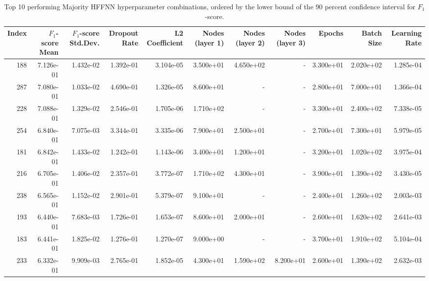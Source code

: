 \begin{table}
\caption{Top 10 performing Majority HFFNN hyperparameter combinations, ordered by the lower bound of the 90 percent confidence interval for $F_1$-score.}
\label{tab:05_best_majority_hffnn_hpars}
\begin{tabular}{rrrrrrrrrrr}
\toprule
Index & $F_1$-score Mean & $F_1$-score Std.Dev. & Dropout Rate & L2 Coefficient & Nodes (layer 1) & Nodes (layer 2) & Nodes (layer 3) & Epochs & Batch Size & Learning Rate \\
\midrule
188 & 7.126e-01 & 1.432e-02 & 1.392e-01 & 3.104e-05 & 3.500e+01 & 4.650e+02 & - & 3.300e+01 & 2.020e+02 & 1.285e-04 \\
287 & 7.080e-01 & 1.033e-02 & 4.690e-01 & 1.326e-05 & 8.600e+01 & - & - & 2.800e+01 & 7.000e+01 & 1.366e-04 \\
228 & 7.088e-01 & 1.329e-02 & 2.546e-01 & 1.705e-06 & 1.710e+02 & - & - & 3.300e+01 & 2.400e+02 & 7.338e-05 \\
254 & 6.840e-01 & 7.075e-03 & 3.344e-01 & 3.335e-06 & 7.900e+01 & 2.500e+01 & - & 2.700e+01 & 7.300e+01 & 5.979e-05 \\
181 & 6.842e-01 & 1.433e-02 & 1.242e-01 & 1.143e-06 & 3.400e+01 & 1.200e+01 & - & 3.200e+01 & 1.020e+02 & 3.975e-04 \\
216 & 6.705e-01 & 1.406e-02 & 2.357e-01 & 3.772e-07 & 1.710e+02 & 4.300e+01 & - & 3.900e+01 & 1.390e+02 & 3.430e-05 \\
238 & 6.565e-01 & 1.152e-02 & 2.901e-01 & 5.379e-07 & 9.100e+01 & - & - & 2.400e+01 & 1.260e+02 & 2.003e-03 \\
193 & 6.440e-01 & 7.683e-03 & 1.726e-01 & 1.653e-07 & 8.600e+01 & 2.000e+01 & - & 2.600e+01 & 1.620e+02 & 2.641e-03 \\
183 & 6.441e-01 & 1.825e-02 & 1.276e-01 & 1.270e-07 & 9.000e+00 & - & - & 3.700e+01 & 1.910e+02 & 5.104e-04 \\
233 & 6.332e-01 & 9.909e-03 & 2.765e-01 & 1.852e-05 & 4.300e+01 & 1.590e+02 & 8.200e+01 & 2.600e+01 & 1.390e+02 & 2.632e-03 \\
\bottomrule
\end{tabular}
\end{table}
